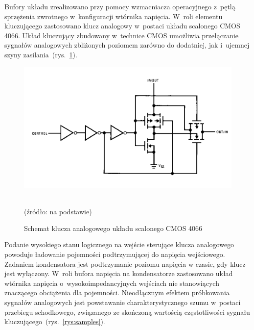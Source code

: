 Bufory układu zrealizowano przy pomocy wzmacniacza operacyjnego z~pętlą sprzężenia zwrotnego w~konfiguracji wtórnika napięcia. W~roli elementu kluczującego zastosowano klucz analogowy w~postaci układu scalonego
CMOS 4066. Układ kluczujący zbudowany w~technice CMOS umożliwia przełączanie sygnałów analogowych zbliżonych poziomem zarówno do dodatniej, jak i~ujemnej szyny zasilania~(rys.~\ref{rys:4066}).
\begin{figure}[ht]
	\centerline{\includegraphics[scale = 0.4]{graphic/4066}}
	\caption{Schemat klucza analogowego układu scalonego CMOS 4066}
	~\\
	(źródło: na podstawie\cite{4066})
	\label{rys:4066}
\end{figure}

Podanie wysokiego stanu logicznego na wejście sterujące klucza analogowego powoduje ładowanie pojemności podtrzymującej do napięcia wejściowego. Zadaniem kondensatora jest podtrzymanie poziomu napięcia
w czasie, gdy klucz jest wyłączony. W~roli bufora napięcia na kondensatorze zastosowano układ wtórnika napięcia o~wysokoimpedancyjnych wejściach nie stanowiących znaczącego obciążenia dla pojemności. 
Nieodłącznym efektem próbkowania sygnałów analogowych jest powstawanie charakterystycznego szumu w~postaci przebiegu schodkowego, związanego ze skończoną wartością częstotliwości sygnału 
kluczującego~(rys.~\ref{rys:samples}).  

